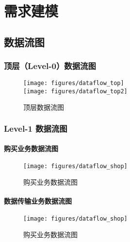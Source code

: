 \chapter{需求建模 }
\section{数据流图}
\subsection{顶层（Level-0）数据流图}

\begin{figure}[h!]
  \centering

  \texttt{[image: figures/dataflow\_top]}
  \\
  \texttt{[image: figures/dataflow\_top2]}

  \caption{  \label{fig:desttop_home}
  		顶层数据流图
    }
\end{figure}

\newpage

\subsection{Level-1 数据流图}

\subsubsection{购买业务数据流图}

\begin{figure}[h!]
  \centering

  \texttt{[image: figures/dataflow\_shop]}

  \caption{  \label{fig:desttop_home}
  		购买业务数据流图
    }
\end{figure}

\newpage

\subsubsection{数据传输业务数据流图}

\begin{figure}[h!]
  \centering

  \texttt{[image: figures/dataflow\_shop]}

  \caption{  \label{fig:desttop_data}
  		购买业务数据流图
    }
\end{figure}